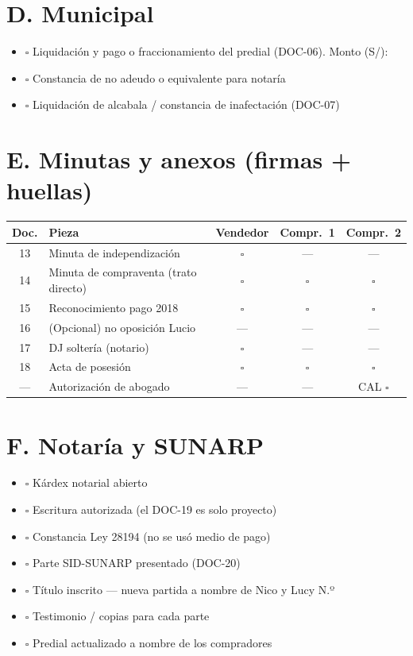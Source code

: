 \documentclass[12pt,a4paper]{article}
\begin{document}
\section*{D. Municipal}
\begin{itemize}[leftmargin=0.9cm]
\item $\square$ Liquidación y pago o fraccionamiento del predial (DOC-06). Monto (S/): \DeudaPredialReferencia
\item $\square$ Constancia de no adeudo o equivalente para notaría
\item $\square$ Liquidación de alcabala / constancia de inafectación (DOC-07)
\end{itemize}

\section*{E. Minutas y anexos (firmas + huellas)}
{\small\renewcommand{\arraystretch}{1.18}
\noindent\begin{tabularx}{\linewidth}{@{}c >{\raggedright\arraybackslash}X c c c@{}}
\toprule
Doc. & Pieza & Vendedor & Compr.\ 1 & Compr.\ 2 \\
\midrule
13 & Minuta de independización & $\square$ & --- & --- \\
14 & Minuta de compraventa (trato directo) & $\square$ & $\square$ & $\square$ \\
15 & Reconocimiento pago 2018 & $\square$ & $\square$ & $\square$ \\
16 & (Opcional) no oposición Lucio & --- & --- & --- \\
17 & DJ soltería (notario) & $\square$ & --- & --- \\
18 & Acta de posesión & $\square$ & $\square$ & $\square$ \\
--- & Autorización de abogado & --- & --- & CAL $\square$ \\
\bottomrule
\end{tabularx}}

\section*{F. Notaría y SUNARP}
\begin{itemize}[leftmargin=0.9cm]
\item $\square$ Kárdex notarial abierto
\item $\square$ Escritura autorizada (el DOC-19 es solo proyecto)
\item $\square$ Constancia Ley 28194 (no se usó medio de pago)
\item $\square$ Parte SID-SUNARP presentado (DOC-20)
\item $\square$ Título inscrito --- nueva partida a nombre de Nico y Lucy N.º\ \linea[4.2cm]
\item $\square$ Testimonio / copias para cada parte
\item $\square$ Predial actualizado a nombre de los compradores
\end{itemize}
\end{document}
